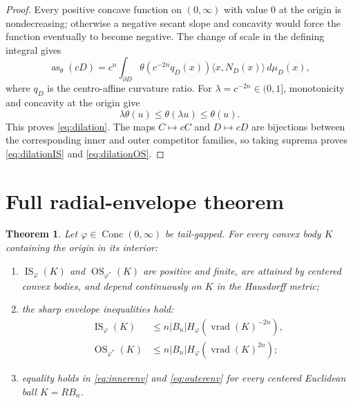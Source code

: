 \documentclass[11pt]{article}
\newtheorem{theorem}{Theorem}
\newcommand{\as}{\operatorname{as}}
\newcommand{\IS}{\operatorname{IS}}
\newcommand{\OS}{\operatorname{OS}}
\newcommand{\vrad}{\operatorname{vrad}}
\begin{document}
\begin{proof}
Every positive concave function on $(0,\infty)$ with value $0$ at the origin
is nondecreasing; otherwise a negative secant slope and concavity would force
the function eventually to become negative.  The change of scale in the
defining integral gives
\[
 \as_\theta(cD)
 =c^n\int_{\partial D}\theta(c^{-2n}q_D(x))
   \langle x,N_D(x)\rangle\,d\mu_D(x),
\]
where $q_D$ is the centro-affine curvature ratio.  For
$\lambda=c^{-2n}\in(0,1]$, monotonicity and concavity at the origin give
\[
 \lambda\theta(u)\leq\theta(\lambda u)\leq\theta(u).
\]
This proves \eqref{eq:dilation}.  The maps $C\mapsto cC$ and $D\mapsto cD$
are bijections between the corresponding inner and outer competitor
families, so taking suprema proves \eqref{eq:dilationIS} and
\eqref{eq:dilationOS}.
\end{proof}

\section{Full radial-envelope theorem}

\begin{theorem}\label{thm:envelopes}
Let $\varphi\in\operatorname{Conc}(0,\infty)$ be tail-gapped.  For every
convex body $K$ containing the origin in its interior:
\begin{enumerate}
 \item $\IS_\varphi(K)$ and $\OS_{\varphi^*}(K)$ are positive and finite,
 are attained by centered convex bodies, and depend continuously on $K$ in
 the Hausdorff metric;
 \item the sharp envelope inequalities hold:
 \begin{align}
  \IS_\varphi(K)
  &\leq n|B_n|H_\varphi(\vrad(K)^{-2n}),
  \label{eq:innerenv}\\
  \OS_{\varphi^*}(K)
  &\leq n|B_n|H_\varphi(\vrad(K)^{2n});
  \label{eq:outerenv}
 \end{align}
 \item equality holds in \eqref{eq:innerenv} and \eqref{eq:outerenv} for
 every centered Euclidean ball $K=RB_n$.
\end{enumerate}
\end{theorem}
\end{document}

